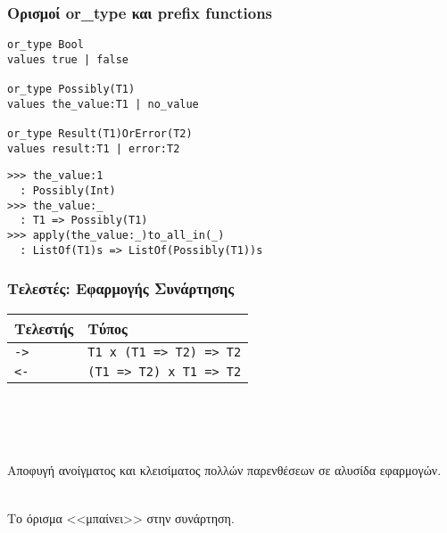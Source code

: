 \documentclass{beamer}
\def\e{\foreignlanguage{english}}
\begin{document}
\begin{frame}[fragile]

\frametitle{Ορισμοί \e{or\_type} και \e{prefix functions}}


\begin{otherlanguage}{english}
\begin{verbatim}
or_type Bool
values true | false

or_type Possibly(T1)
values the_value:T1 | no_value

or_type Result(T1)OrError(T2)
values result:T1 | error:T2
\end{verbatim}
\pause
\begin{verbatim}
>>> the_value:1
  : Possibly(Int)
>>> the_value:_
  : T1 => Possibly(T1)
>>> apply(the_value:_)to_all_in(_)
  : ListOf(T1)s => ListOf(Possibly(T1))s

\end{verbatim}
\end{otherlanguage}

\end{frame}

\begin{frame}[fragile]

\frametitle{Τελεστές: Εφαρμογής Συνάρτησης}

\begin{center}
\begin{tabular}{ |P{2cm}|P{5cm}| }
 \hline
 Τελεστής & Τύπος
 \\
 \hline
 \e{\texttt{->}} & \e{\texttt{T1 x (T1 => T2) => T2}}
 \\
 \e{\texttt{<-}} & \e{\texttt{(T1 => T2) x T1 => T2}}
 \\
 \hline
\end{tabular}
\\~\
\\~\
\end{center}

\pause
Αποφυγή ανοίγματος και κλεισίματος πολλών παρενθέσεων σε αλυσίδα εφαρμογών.
\\~\

Το όρισμα <<μπαίνει>> στην συνάρτηση.
\end{frame}
\end{document}
